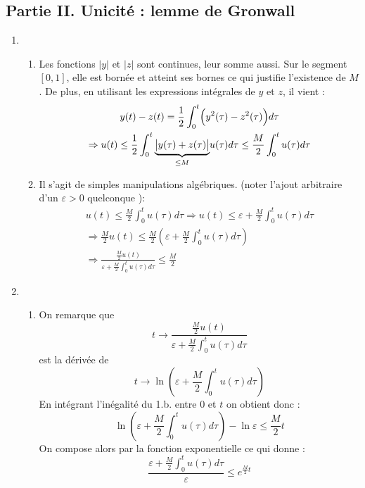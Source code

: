 \subsection*{Partie II. Unicité : lemme de Gronwall}
\begin{enumerate}
 \item \begin{enumerate}
 \item Les fonctions $|y|$ et $|z|$ sont continues, leur somme aussi. Sur le segment $[0,1]$, elle est bornée et atteint ses bornes ce qui justifie l'existence de $M$. De plus, en utilisant les expressions intégrales de $y$ et $z$, il vient :
\begin{multline*}
 y(t)-z(t)=
\frac{1}{2}\int_0^t\Bigl(y^2(\tau) - z^2(\tau) \Bigr)d\tau \\
\Rightarrow
u(t) \leq 
\frac{1}{2}\int_0^t
\underset{\leq M}{\underbrace{\bigl|y(\tau) + z(\tau)\bigr|}}
u(\tau) d\tau
\leq \frac{M}{2}\int_0^tu(\tau)d\tau
\end{multline*}

\item Il s'agit de simples manipulations algébriques. (noter l'ajout arbitraire d'un $\varepsilon>0$ quelconque ):
\begin{multline*}
 u(t)\leq \frac{M}{2}\int_0^tu(\tau)d\tau
\Rightarrow
u(t)\leq \varepsilon + \frac{M}{2}\int_0^tu(\tau)d\tau \\
\Rightarrow
\frac{M}{2}u(t)\leq \frac{M}{2}\left( \varepsilon + \frac{M}{2}\int_0^tu(\tau)d\tau\right) \\
\Rightarrow
\frac{\frac{M}{2}u(t)}{\varepsilon + \frac{M}{2}\int_0^tu(\tau)d\tau}\leq \frac{M}{2}
\end{multline*}

\end{enumerate}
\item \begin{enumerate}
 \item On remarque que 
\begin{displaymath}
 t \rightarrow 
\frac{\frac{M}{2}u(t)}{\varepsilon + \frac{M}{2}\int_0^tu(\tau)d\tau}
\end{displaymath} 
est la dérivée de 
\begin{displaymath}
 t \rightarrow 
\ln \left( \varepsilon + \frac{M}{2}\int_0^tu(\tau)d\tau \right) 
\end{displaymath}
En intégrant l'inégalité du 1.b. entre $0$ et $t$ on obtient donc :
\begin{displaymath}
 \ln \left( \varepsilon + \frac{M}{2}\int_0^tu(\tau)d\tau \right)  -\ln \varepsilon 
\leq \frac{M}{2}t
\end{displaymath}
On compose alors par la fonction exponentielle ce qui donne :
\begin{displaymath}
 \frac{\varepsilon + \frac{M}{2}\int_0^tu(\tau)d\tau}{\varepsilon}
\leq e^{\frac{M}{2}t}
\end{displaymath}


\end{enumerate}
\end{enumerate}
